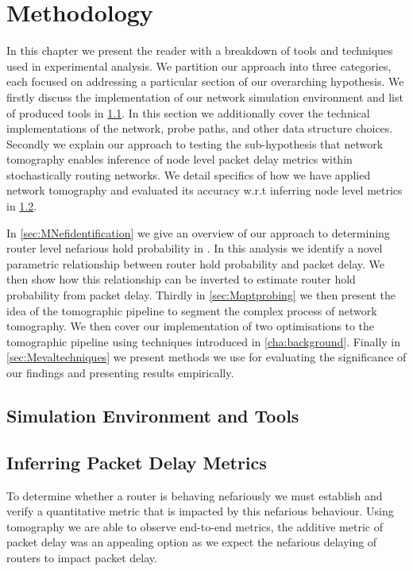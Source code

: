 \chapter{Methodology}
\label{cha:methodology}
In this chapter we present the reader with a breakdown of tools and techniques used in experimental analysis. We partition our approach into three categories, each focused on addressing a particular section of our overarching hypothesis. We firstly discuss the implementation of our network simulation environment and list of produced tools in \cref{sec:Msimenvironment}. In this section we additionally cover the technical implementations of the network, probe paths, and other data structure choices. Secondly we explain our approach to testing the sub-hypothesis that network tomography enables inference of node level packet delay metrics within stochastically routing networks. We detail specifics of how we have applied network tomography and evaluated its accuracy w.r.t inferring node level metrics in \cref{sec:Mnetworkprobing}.\par
In \cref{sec:MNefidentification} we give an overview of our approach to determining router level nefarious hold probability in . In this analysis we identify a novel parametric relationship between router hold probability and packet delay. We then show how this relationship can be inverted to estimate router hold probability from packet delay. Thirdly in \cref{sec:Moptprobing} we then present the idea of the tomographic pipeline to segment the complex process of network tomography. We then cover our implementation of two optimisations to the tomographic pipeline using techniques introduced in \cref{cha:background}. Finally in \cref{sec:Mevaltechniques} we present methods we use for evaluating the significance of our findings and presenting results empirically.

\section{Simulation Environment and Tools}
\label{sec:Msimenvironment}

\section{Inferring Packet Delay Metrics}
\label{sec:Mnetworkprobing}
    To determine whether a router is behaving nefariously we must establish and verify a quantitative metric that is impacted by this nefarious behaviour. Using tomography we are able to observe end-to-end metrics, the additive metric of packet delay was an appealing option as we expect the nefarious delaying of routers to impact packet delay.
    
